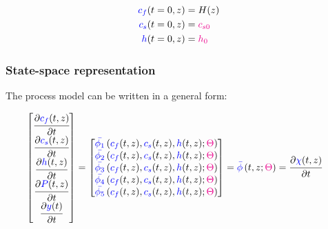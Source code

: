 \documentclass[../Article_Model_Parameters.tex]{subfiles}
\begin{document}
		{\footnotesize
			\begin{subequations}
				\begin{align*}
					{\color{blue}c_f}(t = 0, z) &= H(z)   \\
					{\color{blue}c_s}(t = 0, z) &= {\color{magenta}c_{s0}} \\
					{\color{blue}h}(t = 0, z) &= {\color{magenta}h_0}
				\end{align*}
		\end{subequations} }
	
		\subsubsection{State-space representation} \label{CH: State_space}
			
		The process model can be written in a general form:
			
		{\footnotesize
			\begin{align}
				\begin{bmatrix}
					\cfrac{\partial {\color{blue}c_f}(t,z)}{\partial t}\\
					\cfrac{\partial {\color{blue}c_s}(t,z)}{\partial t}\\
					\cfrac{\partial {\color{blue}h}(t,z)}{\partial t} \\
					\cfrac{\partial {\color{blue}P}(t,z)}{\partial t} \\
					\cfrac{\partial {\color{blue}y}(t)}{\partial t} 
				\end{bmatrix}
				& =
				\begin{bmatrix}
					{\color{blue}\bar{\phi_1}} \left( {\color{blue}c_f}(t,z),{\color{blue}c_s}(t,z),{\color{blue}h}(t,z); {\color{magenta}\Theta} \right)\\
					{\color{blue}\bar{\phi_2}} \left( {\color{blue}c_f}(t,z),{\color{blue}c_s}(t,z),{\color{blue}h}(t,z); {\color{magenta}\Theta} \right)\\
					{\color{blue}\bar{\phi_3}} \left( {\color{blue}c_f}(t,z),{\color{blue}c_s}(t,z),{\color{blue}h}(t,z); {\color{magenta}\Theta} \right) \\
					{\color{blue}\bar{\phi_4}} \left( {\color{blue}c_f}(t,z),{\color{blue}c_s}(t,z),{\color{blue}h}(t,z); {\color{magenta}\Theta} \right)\\
					{\color{blue}\bar{\phi_5}} \left( {\color{blue}c_f}(t,z),{\color{blue}c_s}(t,z),{\color{blue}h}(t,z); {\color{magenta}\Theta} \right)
				\end{bmatrix} = {\color{blue}\bar{\phi}} \left( t,z; {\color{magenta}\Theta} \right) = \cfrac{\partial {\color{blue}\chi}(t,z)}{\partial t}
		\end{align} }
			
\end{document}
